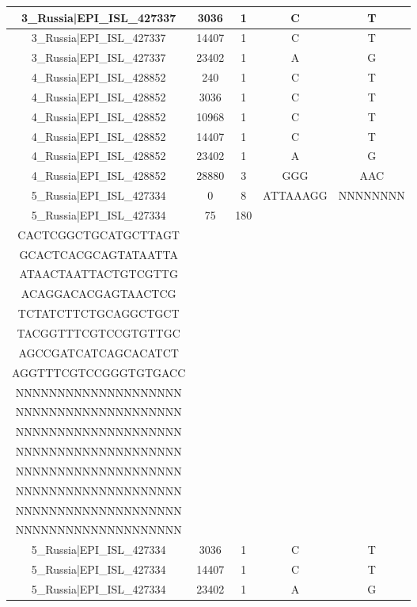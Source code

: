 \documentclass[a4paper,10pt]{article}
\begin{document}
\begin{longtable}{@{}ccccc@{}}
3\_Russia|EPI\_ISL\_427337 & 3036 & 1 & C & T \\* \midrule
3\_Russia|EPI\_ISL\_427337 & 14407 & 1 & C & T \\* \midrule
3\_Russia|EPI\_ISL\_427337 & 23402 & 1 & A & G \\* \midrule
4\_Russia|EPI\_ISL\_428852 & 240 & 1 & C & T \\* \midrule
4\_Russia|EPI\_ISL\_428852 & 3036 & 1 & C & T \\* \midrule
4\_Russia|EPI\_ISL\_428852 & 10968 & 1 & C & T \\* \midrule
4\_Russia|EPI\_ISL\_428852 & 14407 & 1 & C & T \\* \midrule
4\_Russia|EPI\_ISL\_428852 & 23402 & 1 & A & G \\* \midrule
4\_Russia|EPI\_ISL\_428852 & 28880 & 3 & GGG & AAC \\* \midrule
5\_Russia|EPI\_ISL\_427334 & 0 & 8 & ATTAAAGG & NNNNNNNN \\* \midrule
5\_Russia|EPI\_ISL\_427334 & 75 & 180 & \begin{tabular}[c]{@{}c@{}}TTTAAAATCTGTGTGGCTGT\\ CACTCGGCTGCATGCTTAGT\\ GCACTCACGCAGTATAATTA\\ ATAACTAATTACTGTCGTTG\\ ACAGGACACGAGTAACTCG\\ TCTATCTTCTGCAGGCTGCT\\ TACGGTTTCGTCCGTGTTGC\\ AGCCGATCATCAGCACATCT\\ AGGTTTCGTCCGGGTGTGACC\end{tabular} & \begin{tabular}[c]{@{}c@{}}NNNNNNNNNNNNNNNNNNNN\\ NNNNNNNNNNNNNNNNNNNN\\ NNNNNNNNNNNNNNNNNNNN\\ NNNNNNNNNNNNNNNNNNNN\\ NNNNNNNNNNNNNNNNNNNN\\ NNNNNNNNNNNNNNNNNNNN\\ NNNNNNNNNNNNNNNNNNNN\\ NNNNNNNNNNNNNNNNNNNN\\ NNNNNNNNNNNNNNNNNNNN\end{tabular} \\* \midrule
5\_Russia|EPI\_ISL\_427334 & 3036 & 1 & C & T \\* \midrule
5\_Russia|EPI\_ISL\_427334 & 14407 & 1 & C & T \\* \midrule
5\_Russia|EPI\_ISL\_427334 & 23402 & 1 & A & G \\* \midrule

\end{longtable}
\end{document}
